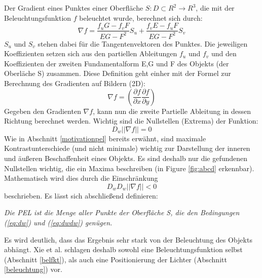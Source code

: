 \documentclass{paperStyle}
\begin{document}
Der Gradient eines Punktes einer Oberfläche $S : D \subset R^{2} \longrightarrow R^{3}$, die mit der Beleuchtungsfunktion $f$ beleuchtet wurde, berechnet sich durch:
\begin{equation}
\nabla f = \frac{ f_{ u }G - f_{ v }F }{EG - F^{ 2 }  }S_{ u } + \frac{ f_{ v }E - f_{ u }F }{EG - F^{ 2 } } S_{ v }  
	\label{eq:gradientf}
\end{equation}
$S_{ u } $ und $S_{ v }$ stehen dabei für die Tangentenvektoren des Punktes. Die jeweiligen Koeffizienten setzen sich aus den partiellen Ableitungen $f_{ u }$ und $f_{ v }$ und den Koeffizienten der zweiten Fundamentalform E,G und F des Objekts (der Oberläche S) zusammen.
Diese Definition geht einher mit der Formel zur Berechnung des Gradienten auf Bildern (2D):
\begin{equation}
\nabla f =  \left( \frac{ \partial f}{\partial x} \frac{ \partial f}{\partial y} \right )
	\label{eq:gradient2D}
\end{equation}
Gegeben den Gradienten $\nabla f$, kann nun die zweite Partielle Ableitung in dessen Richtung berechnet werden. Wichtig sind die Nullstellen (Extrema) der Funktion:
\begin{equation}
D_{w}||\nabla f || = 0
	\label{eq:dw}
\end{equation}
Wie in Abschnitt \ref{motivationpel} bereits erwähnt, sind maximale Kontrastunterschiede (und nicht minimale) wichtig zur Darstellung der inneren und äußeren Beschaffenheit eines Objekts. Es sind deshalb nur die gefundenen Nullstellen wichtig, die ein Maxima beschreiben (in Figure \ref{fig:abcd} erkennbar). Mathematisch wird dies durch die Einschränkung
\begin{equation}
D_{w}D_{w}||\nabla f || < 0	
\label{eq:dwdw}
\end{equation}
beschrieben. Es lässt sich abschließend definieren:

\textit{Die PEL ist die Menge aller Punkte der Oberfläche S, die den Bedingungen (\ref{eq:dw}) und (\ref{eq:dwdw}) genügen.}

Es wird deutlich, dass das Ergebnis sehr stark von der Beleuchtung des Objekts abhängt. Xie et al. schlagen deshalb sowohl eine Beleuchtungsfunktion selbst (Abschnitt \ref{belfkt}), als auch eine Positionierung der Lichter (Abschnitt \ref{beleuchtung}) vor.
\end{document}
